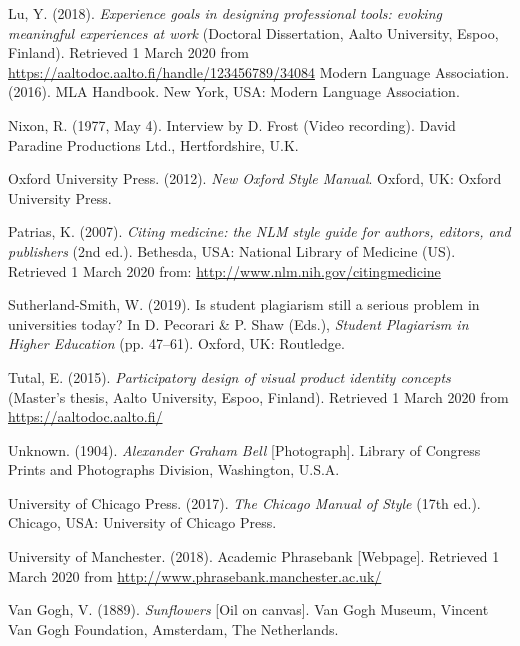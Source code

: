 \documentclass[english, 12pt, a4paper, elec, utf8, a-2b, online]{aaltothesis}
\begin{document}
\vspace{1ex}
\noindent
Lu, Y. (2018). 
\textit{Experience goals in designing professional tools: evoking meaningful 
	experiences at work} 
(Doctoral Dissertation, Aalto University, Espoo, Finland). 
Retrieved 1 March 2020 from 
\url{https://aaltodoc.aalto.fi/handle/123456789/34084} 
Modern Language Association. (2016). MLA Handbook. New York, USA: Modern 
Language Association.

\vspace{1ex}
\noindent
Nixon, R. (1977, May 4). Interview by D. Frost (Video recording). 
David Paradine Productions Ltd., Hertfordshire, U.K.

\vspace{1ex}
\noindent
Oxford University Press. (2012). 
\textit{New Oxford Style Manual}. Oxford, UK: Oxford University Press.

\vspace{1ex}
\noindent
Patrias, K. (2007). 
\textit{Citing medicine: the NLM style guide for authors, editors, and 
	publishers} 
(2nd ed.). Bethesda, USA: National Library of Medicine (US). 
Retrieved 1 March 2020 from: \url{http://www.nlm.nih.gov/citingmedicine}

\vspace{1ex}
\noindent
Sutherland-Smith, W. (2019). Is student plagiarism still a serious problem in 
universities today? In D. Pecorari \& P. Shaw (Eds.), 
\textit{Student Plagiarism in Higher Education} (pp. 47--61). 
Oxford, UK: Routledge.

\vspace{1ex}
\noindent
Tutal, E. (2015). 
\textit{Participatory design of visual product identity concepts} 
(Master’s thesis, Aalto University, Espoo, Finland). 
Retrieved 1 March 2020 from \url{https://aaltodoc.aalto.fi/}

\vspace{1ex}
\noindent
Unknown. (1904). \textit{Alexander Graham Bell} [Photograph]. 
Library of Congress Prints and Photographs Division, Washington, U.S.A.

\vspace{1ex}
\noindent
University of Chicago Press. (2017). \textit{The Chicago Manual of Style} 
(17th ed.). Chicago, USA: University of Chicago Press.

\vspace{1ex}
\noindent
University of Manchester. (2018). Academic Phrasebank [Webpage]. 
Retrieved 1 March 2020 from \url{http://www.phrasebank.manchester.ac.uk/}

\vspace{1ex}
\noindent
Van Gogh, V. (1889). \textit{Sunflowers} [Oil on canvas]. 
Van Gogh Museum, Vincent Van Gogh Foundation, Amsterdam, The Netherlands.
\end{document}

